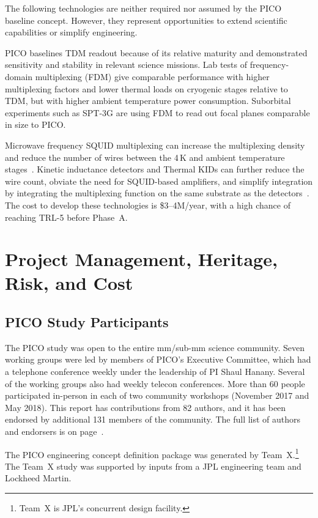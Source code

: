 The following technologies are neither required nor assumed by the PICO baseline concept. However, they represent opportunities to extend scientific capabilities or simplify engineering.

PICO baselines TDM readout because of its relative maturity and demonstrated sensitivity and stability in relevant science missions. Lab tests of frequency-domain multiplexing (FDM) give comparable performance with higher multiplexing factors and lower thermal loads on cryogenic stages relative to TDM, but with higher ambient temperature power consumption. Suborbital experiments such as SPT-3G are using FDM to read out focal planes comparable in size to PICO.

Microwave frequency SQUID multiplexing can increase the multiplexing density and reduce the number of wires between the 4\,K and ambient temperature stages~\citep{Dober2017,Irwin2004}. Kinetic inductance detectors and Thermal KIDs can further reduce the wire count, obviate the need for SQUID-based amplifiers, and simplify integration by integrating the multiplexing function on the same substrate as the detectors~\citep{McCarrick2018,Steinbach2018,Johnson2018}. The cost to develop these technologies is \$3--4M/year, with a high chance of reaching TRL-5 before Phase~A.

\section{Project Management, Heritage, Risk, and Cost}
\label{sec:project_management} %

\subsection{PICO Study Participants}
\label{sec:study_participants} %

The PICO study was open to the entire mm/sub-mm science community. Seven working groups were led by members of PICO's Executive Committee, which had a telephone conference weekly under the leadership of PI Shaul Hanany. Several of the working groups also had weekly telecon conferences. More than 60 people participated in-person in each of two community workshops (November 2017 and May 2018). This report has contributions from 82 authors, and it has been endorsed by additional 131 members of the community.  The full list of authors and endorsers is on page~\pageref{authorlist}.


The PICO engineering concept definition package was generated by Team~X.\footnote{\label{teamx} Team~X is JPL's concurrent design facility.} The Team~X study was supported by inputs from a JPL engineering team and Lockheed Martin.



